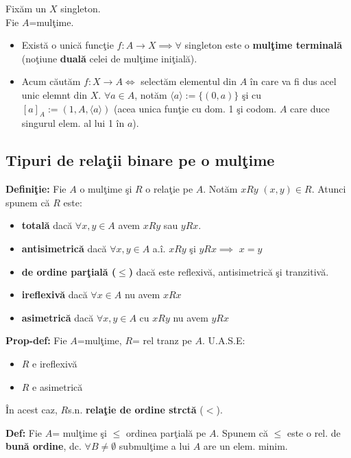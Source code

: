 \documentclass{article}
\begin{document}
Fix\u am un $X$ singleton.\\
Fie $A$=mul\c time.\\
\begin{itemize}
    \item Exist\u a o unic\u a func\c tie $f:A \rightarrow X \implies \forall$ singleton este o \textbf{mul\c time terminal\u a} (no\c tiune \textbf{dual\u a} celei de mul\c time ini\c tial\u a).
    \item Acum c\u aut\u am $f:X \rightarrow A \iff$ select\u am elementul din $A$ \^ in care va fi dus acel unic elemnt din $X$. $\forall a\in A$, not\u am $\langle a \rangle :=\{(0,a)\}$ \c si cu $[a]_A:=(1,A,\langle a\rangle )$ (acea unica fun\c tie cu dom. 1 \c si codom. $A$ care duce singurul elem. al lui 1 \^ in $a$).

\end{itemize}

\subsection{Tipuri de rela\c tii binare pe o mul\c time}

\textbf{Defini\c tie:} Fie $A$ o mul\c time \c si $R$ o rela\c tie pe $A$. Not\u am $xRy$ $(x,y)\in R$. Atunci spunem c\u a $R$ este:
\begin{itemize}
    \item \textbf{total\u a} dac\u a $\forall x,y\in A$ avem $xRy$ sau $yRx$.
    \item \textbf{antisimetric\u a} dac\u a $\forall x,y\in A$ a.\^ i. $xRy$ \c si $yRx \implies$ $x=y$
    \item \textbf{de ordine par\c tial\u a ($\leq$)} dac\u a este reflexiv\u a, antisimetric\u a \c si tranzitiv\u a.
    \item \textbf{ireflexiv\u a} dac\u a $\forall x\in A$ nu avem $xRx$
    \item \textbf{asimetric\u a} dac\u a $\forall x,y\in A$ cu $xRy$ nu avem $yRx$
\end{itemize}

\textbf{Prop-def:} Fie $A$=mul\c time, $R$= rel tranz pe $A$. U.A.S.E:
\begin{itemize}
    \item $R$ e ireflexiv\u a
    \item $R$ e asimetric\u a
\end{itemize}
\^ In acest caz, $R$s.n. \textbf{rela\c tie de ordine strct\u a} ($<$).

\textbf{Def:} Fie $A$= mul\c time \c si $\leq$ ordinea par\c tial\u a pe $A$. Spunem c\u a $\leq$ este o rel. de \textbf{bun\u a ordine}, dc. $\forall B \neq \emptyset$ submul\c time a lui $A$ are un elem. minim.
\end{document}
